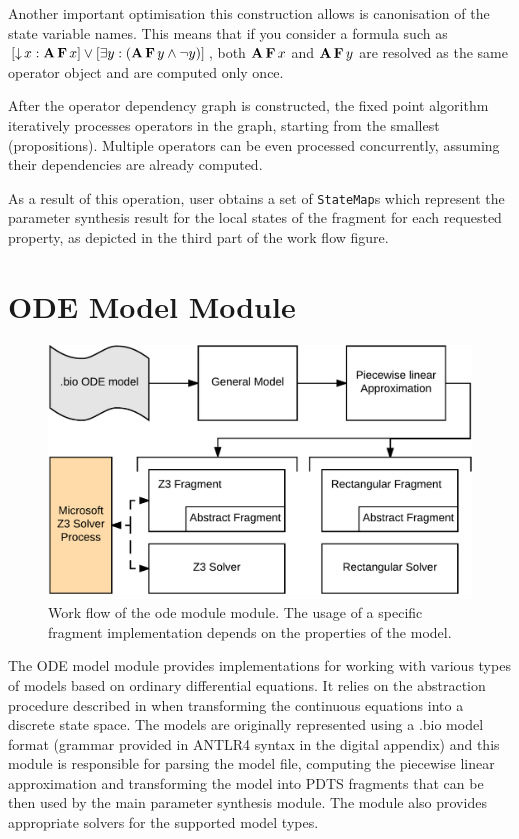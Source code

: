 Another important optimisation this construction allows is canonisation of the state variable names. This means that if you consider a formula such as $[\operatorname{\downarrow} x : \operatorname{\mathbf{A}}\operatorname{\mathbf{F}} x] \lor [\exists y : (\operatorname{\mathbf{A}} \operatorname{\mathbf{F}} y \land \neg y)]$, both $\operatorname{\mathbf{A}}\operatorname{\mathbf{F}} x$ and $\operatorname{\mathbf{A}}\operatorname{\mathbf{F}} y$ are resolved as the same operator object and are computed only once. 

After the operator dependency graph is constructed, the fixed point algorithm iteratively processes operators in the graph, starting from the smallest (propositions). Multiple operators can be even processed concurrently, assuming their dependencies are already computed.  

As a result of this operation, user obtains a set of \texttt{StateMap}s which represent the parameter synthesis result for the local states of the fragment for each requested property, as depicted in the third part of the work flow figure.

\section{ODE Model Module}


\begin{figure}[]
	\centering
	\includegraphics[scale=0.45]{media/ode_workflow.pdf}
	\caption{Work flow of the ode module module. The usage of a specific fragment implementation depends on the properties of the model. }
	\label{fig:ode_workflow}
\end{figure}

The ODE model module provides implementations for working with various types of models based on ordinary differential equations. It relies on the abstraction procedure described in \cite{abs, absOverview} when transforming the continuous equations into a discrete state space. The models are originally represented using a .bio model format (grammar provided in ANTLR4 syntax in the digital appendix) and this module is responsible for parsing the model file, computing the piecewise linear approximation and transforming the model into \ac{PDTS} fragments that can be then used by the main parameter synthesis module. The module also provides appropriate solvers for the supported model types.	

